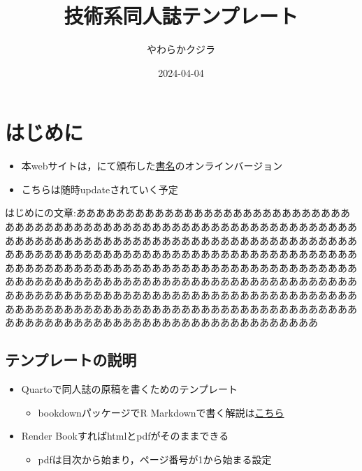 \documentclass[
  b5paper,
  xelatex, ja=standard]{bxjsbook}
\title{技術系同人誌テンプレート}
\author{やわらかクジラ}
\date{2024-04-04}
\providecommand{\tightlist}{%
  \setlength{\itemsep}{0pt}\setlength{\parskip}{0pt}}\usepackage{longtable,booktabs,array}
\renewcommand*\contentsname{Table of contents}
\newcommand\contentsname{Table of contents}
\begin{document}
\maketitle

\renewcommand*\contentsname{目次}
{
\hypersetup{linkcolor=}
\setcounter{tocdepth}{2}
\tableofcontents
}

\chapter*{はじめに}\label{ux306fux3058ux3081ux306b}


\begin{itemize}
\tightlist
\item
  本webサイトは，にて頒布した\href{url}{書名}のオンラインバージョン
\item
  こちらは随時updateされていく予定
\end{itemize}

はじめにの文章:ああああああああああああああああああああああああああああああああああああああああああああああああああああああああああああああああああああああああああああああああああああああああああああああああああああああああああああああああああああああああああああああああああああああああああああああああああああああああああああああああああああああああああああああああああああああああああああああああああああああああああああああああああああああああああああああああああああああああああああああああああああああああああああああああああああああああああああああああああああああああああああああああああああああああああああああああああああああああ

\section*{テンプレートの説明}\label{ux30c6ux30f3ux30d7ux30ecux30fcux30c8ux306eux8aacux660e}


\begin{itemize}
\item
  Quartoで同人誌の原稿を書くためのテンプレート

  \begin{itemize}
  \tightlist
  \item
    bookdownパッケージでR
    Markdownで書く解説は\href{https://izunyan.github.io/dojinshi-template-rmd/}{こちら}
  \end{itemize}
\item
  Render Bookすればhtmlとpdfがそのままできる

  \begin{itemize}
  \tightlist
  \item
    pdfは目次から始まり，ページ番号が1から始まる設定
  \end{itemize}
\end{itemize}
\end{document}
